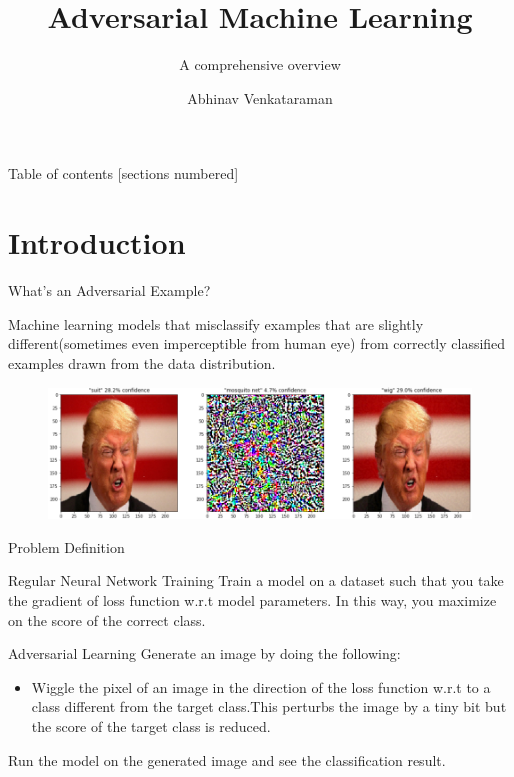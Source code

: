 \documentclass[10pt]{beamer}
\title{Adversarial Machine Learning}
\subtitle{A comprehensive overview}
\date{}
\author{Abhinav Venkataraman}
\institute{Samsung SDS Research America}
\begin{document}
\maketitle

\begin{frame}{Table of contents}
  [sections numbered]
  \tableofcontents[hideallsubsections]
\end{frame}

\section{Introduction}

\begin{frame}[fragile]{What's an Adversarial Example?}

	Machine learning models that misclassify examples that are slightly different(sometimes even imperceptible from human eye) from correctly classified examples drawn from the data distribution. 
	\pause
	\begin{figure}
		\includegraphics[width=\textwidth]{trump-adv}
	\end{figure}
\end{frame}



\begin{frame}{Problem Definition}
	\begin{exampleblock}{Regular Neural Network Training}
	Train a model on a dataset such that you take the gradient of loss function w.r.t model parameters. In this way, you maximize on the score of the correct class.	
	\end{exampleblock}
	\pause
	\begin{alertblock}{Adversarial Learning}
	Generate an image by doing the following: 
	\pause
	\begin{itemize}
		\item Wiggle the pixel of an image in the direction of the loss function w.r.t to a class different from the target class.This perturbs the image by a tiny bit but the score of the target class is reduced. 
	\end{itemize}  
	Run the model on the generated image and see the classification result. 
	\end{alertblock}

\end{frame}
\end{document}
